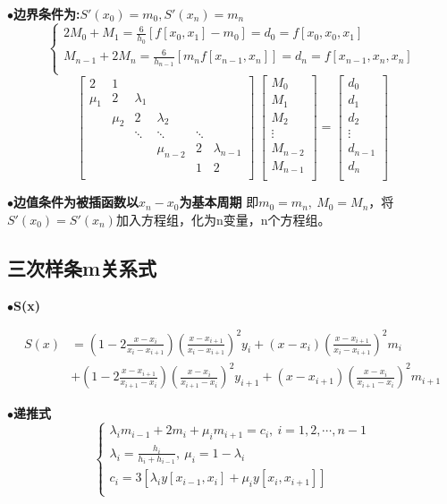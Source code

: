 \documentclass[UTF8]{article}
\newcommand{\keypoint}[2]{$\bullet$\textbf{#1}\quad#2\par}
\begin{document}
\keypoint{边界条件为:$S'(x_0)=m_0,S'(x_n)=m_n$}{
	\[
	\left\{
	\begin{array}{l}
	2M_0+M_1=\frac{6}{h_0}[f[x_0,x_1]-m_0]=d_0=f[x_0,x_0,x_1]\\
	M_{n-1}+2M_n=\frac{6}{h_{n-1}}[m_nf[x_{n-1},x_n]]=d_n=f[x_{n-1},x_n,x_n]\\
	\end{array}
	\right.
	\]
	\[ 
	\left[
	\begin{array}{cccccc}
	2 & 1 & & & & \\
	\mu_1 & 2 & \lambda_1 & & &\\
	& \mu_2 & 2 & \lambda_2 & &\\
	& & \ddots & \ddots & \ddots & \\
	& & & \mu_{n-2} & 2 & \lambda_{n-1} \\
	& & & & 1 & 2\\
	\end{array}
	\right]
	\ 
	\left[
	\begin{array}{c}
	M_0 \\ M_1 \\ M_2 \\ \vdots \\ M_{n-2} \\ M_{n-1} \\
	\end{array}
	\right]
	=
	\left[
	\begin{array}{c}
	d_0 \\ d_1 \\ d_2 \\ \vdots \\ d_{n-1} \\ d_{n} \\
	\end{array}
	\right]
	\]
}
\keypoint{边值条件为被插函数以$x_n-x_0$为基本周期}{
	即$m_0=m_n,\ M_0=M_n$，将$S'(x_0)=S'(x_n)$加入方程组，化为n变量，n个方程组。\par
}
\subsection{三次样条m关系式}
\keypoint{S(x)}{\par
		\begin{align*}
		S(x)&=(1-2\frac{x-x_i}{x_i-x_{i+1}})(\frac{x-x_{i+1}}{x_i-x_{i+1}})^2y_i+(x-x_i)(\frac{x-x_{i+1}}{x_i-x_{i+1}})^2m_i\\
		&+(1-2\frac{x-x_{i+1}}{x_{i+1}-x_i})(\frac{x-x_i}{x_{i+1}-x_i})^2y_{i+1}+(x-x_{i+1})(\frac{x-x_i}{x_{i+1}-x_i})^2m_{i+1}
		\end{align*}
}
\keypoint{递推式}{
	\[ \left\{
	\begin{array}{l}
	\lambda_im_{i-1}+2m_{i}+\mu_im_{i+1}=c_i,\ i=1,2,\cdots,n-1\\
	\lambda_i=\frac{h_i}{h_i+h_{i-1}},\ \mu_i=1-\lambda_i\\
	c_i=3[\lambda_iy[x_{i-1},x_i]+\mu_iy[x_i,x_{i+1}]]\\
	\end{array}
	\right.
	\]
}
\end{document}
